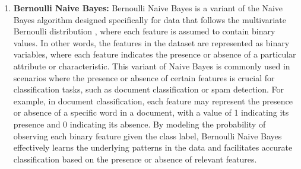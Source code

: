 \begin{enumerate}
\item \textbf{Bernoulli Naive Bayes:} Bernoulli Naive Bayes is a variant of the Naive Bayes algorithm designed specifically for data that follows the multivariate Bernoulli distribution , where each feature is assumed to contain binary values. In other words, the features in the dataset are represented as binary variables, where each feature indicates the presence or absence of a particular attribute or characteristic. This variant of Naive Bayes is commonly used in scenarios where the presence or absence of certain features is crucial for classification tasks, such as document classification or spam detection. For example, in document classification, each feature may represent the presence or absence of a specific word in a document, with a value of 1 indicating its presence and 0 indicating its absence. By modeling the probability of observing each binary feature given the class label, Bernoulli Naive Bayes effectively learns the underlying patterns in the data and facilitates accurate classification based on the presence or absence of relevant features.
\end{enumerate}
